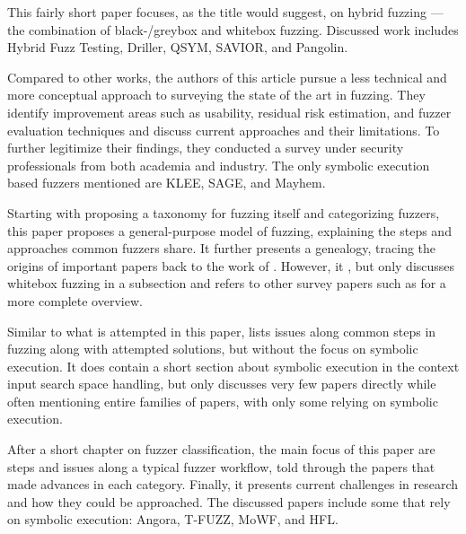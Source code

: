 \documentclass{article}
\begin{document}
\begin{multicols}{2}
  This fairly short paper focuses, as the title would suggest, on hybrid fuzzing — the combination of black-/greybox and whitebox fuzzing. Discussed work includes Hybrid Fuzz Testing\cite{HybridFuzzTesting}, Driller\cite{Driller}, QSYM\cite{QSYM}, SAVIOR\cite{SAVIOR}, and Pangolin\cite{Pangolin}.

  Compared to other works, the authors of this article pursue a less technical and more conceptual approach to surveying the state of the art in fuzzing. They identify improvement areas such as usability, residual risk estimation, and fuzzer evaluation techniques and discuss current approaches and their limitations. To further legitimize their findings, they conducted a survey under security professionals from both academia and industry. The only symbolic execution based fuzzers mentioned are KLEE\cite{KLEE}, SAGE\cite{SAGE}, and Mayhem\cite{Mayhem}.

  Starting with proposing a taxonomy for fuzzing itself and categorizing fuzzers, this paper proposes a general-purpose model of fuzzing, explaining the steps and approaches common fuzzers share. It further presents a genealogy, tracing the origins of important papers back to the work of \citeauthor{UNIX}. However, it \cite{ArtScienceEng}, but only discusses whitebox fuzzing in a subsection and refers to other survey papers such as \cite{Orchestrated, AllYouEverWanted} for a more complete overview.

  Similar to what is attempted in this paper,  lists issues along common steps in fuzzing along with attempted solutions, but without the focus on symbolic execution. It does contain a short section about symbolic execution in the context input search space handling, but only discusses very few papers directly while often mentioning entire families of papers, with only some relying on symbolic execution.

  After a short chapter on fuzzer classification, the main focus of this paper are steps and issues along a typical fuzzer workflow, told through the papers that made advances in each category. Finally, it presents current challenges in research and how they could be approached. The discussed papers include some that rely on symbolic execution: Angora\cite{Angora}, T-FUZZ\cite{TFuzz}, MoWF\cite{MoWF}, and HFL\cite{HFL}.


\end{multicols}
\end{document}
